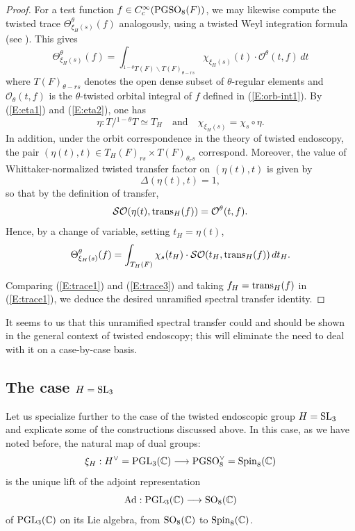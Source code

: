 \documentclass[11pt]{amsart}
\theoremstyle{plain}
\numberwithin{equation}{section}
\newcommand{\C}{\mathbb C}
\def\SL{{\rm SL}}
\def\PGSO{{\rm PGSO}}
\def\Spin{{\rm Spin}}
\def\Spin{{\rm Spin}}
\def\PGL{{\rm PGL}}
\def\SO{{\rm SO}}
\def\C{{\bf C}}
\def\C{{\mathbb C}}
\begin{document}
\begin{proof}
For a test function $f \in C^{\infty}_c(\PGSO_8(F))$, we may likewise compute the twisted trace $\Theta^{\theta}_{\xi_H(s)}(f)$ analogously, using a twisted Weyl integration formula (see \cite[\S 5.7 and \S 5.8]{CG}). This gives
\begin{equation} \label{E:trace2}
  \Theta^{\theta}_{\xi_H(s)}(f) =  \int_{ ^{1-\theta}T(F) \backslash T(F)_{\theta-rs}}  \chi_{\xi_H(s)}(t)  \cdot \mathcal{O}^{\theta}(t, f) \, dt \end{equation}
where $T(F)_{\theta-rs}$ denotes the open dense subset of $\theta$-regular elements and $\mathcal{O}_{\theta}(t, f) $ is the $\theta$-twisted orbital integral  of $f$ defined 
in (\ref{E:orb-int1}).
 By (\ref{E:eta1}) and (\ref{E:eta2}), one has  
\[  \eta: T / {}^{1-\theta}T   \simeq T_H \quad \text{and} \quad    \chi_{\xi_H(s)} = \chi_s \circ \eta. \]
In addition, under the orbit correspondence in the theory of twisted endoscopy, 
the pair $(\eta(t), t)  \in T_H(F)_{rs} \times T(F)_{\theta_rs}$ correspond. Moreover, the value of Whittaker-normalized twisted transfer factor on $(\eta(t), t)$ is given by
\[   \Delta(\eta(t), t) = 1, \]
so that by the definition of transfer,
\[  \mathcal{SO}( \eta(t), {\rm trans}_H(f)) =  \mathcal{O}^{\theta}(t, f). \]   
Hence, by a change of variable, setting $t_H = \eta(t)$,   
\begin{equation} \label{E:trace3}
 \Theta^{\theta}_{\xi_H(s)}(f) =  \int_{ T_H(F)}  \chi_s( t_H)  \cdot \mathcal{SO}( t_H, {\rm trans}_H(f)) \,    dt_H. \end{equation}
\vskip 5pt

Comparing (\ref{E:trace1}) and (\ref{E:trace3}) and taking $f_H = {\rm trans}_H(f)$ in (\ref{E:trace1}), we deduce the desired unramified spectral transfer identity.
\end{proof}
\vskip 5pt

It seems to us that this unramified spectral transfer  could and should be shown in the general context of twisted endoscopy; this will eliminate the need to deal with it on a case-by-case basis.
\vskip 5pt


\subsection{\bf The case $H = \SL_3$} 
Let us specialize further to the case of the twisted endoscopic group $H = \SL_3$ and explicate some of the constructions discussed above.
 In this case,  as we have noted before, the natural map of dual groups:
\[ \xi_H : H^{\vee} = \PGL_3(\C) \longrightarrow \PGSO_8^{\vee} = \Spin_8(\C) \]
  is the unique lift of  the adjoint representation 
\[   {\rm Ad}: \PGL_3(\C) \longrightarrow \SO_8(\C) \]
of $\PGL_3(\C)$ on its Lie algebra, from $\SO_8(\C)$ to $\Spin_8(\C)$. 
\vskip 5pt
\end{document}
